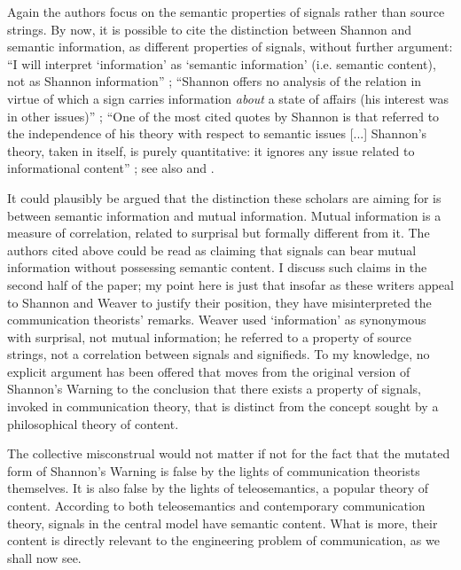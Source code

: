 \noindent Again the authors focus on the semantic properties of signals rather than source strings.
By now, it is possible to cite the distinction between Shannon and semantic information, as different properties of signals, without further argument: ``I will interpret ‘information’ as ‘semantic information’ (i.e. semantic content), not as Shannon information'' \citep[p. 12 n. 14]{artiga2020signals}; ``Shannon offers no analysis of the relation in virtue of which a sign carries information \textit{about} a state of affairs (his interest was in other issues)''  \citep[7]{neander2017mark}; ``One of the most cited quotes by Shannon is that referred to the independence of his theory with respect to semantic issues [...] Shannon’s theory, taken in itself, is purely quantitative: it ignores any issue related to informational content'' \citep[1988-9]{lombardi2015shannon}; see also \citet[6]{cao2020new} and \citet[1]{kolchinsky2018semantic}.

It could plausibly be argued that the distinction these scholars are aiming for is between semantic information and mutual information.
Mutual information is a measure of correlation, related to surprisal but formally different from it.
The authors cited above could be read as claiming that signals can bear mutual information without possessing semantic content.
I discuss such claims in the second half of the paper; my point here is just that insofar as these writers appeal to Shannon and Weaver to justify their position, they have misinterpreted the communication theorists' remarks.
Weaver used `information' as synonymous with surprisal, not mutual information; he referred to a property of source strings, not a correlation between signals and signifieds.
To my knowledge, no explicit argument has been offered that moves from the original version of {\sc Shannon's Warning} to the conclusion that there exists a property of signals, invoked in communication theory, that is distinct from the concept sought by a philosophical theory of content.

The collective misconstrual would not matter if not for the fact that the mutated form of {\sc Shannon's Warning} is false by the lights of communication theorists themselves.
It is also false by the lights of teleosemantics, a popular theory of content.
According to both teleosemantics and contemporary communication theory, signals in the central model have semantic content.
What is more, their content is directly relevant to the engineering problem of communication, as we shall now see.



